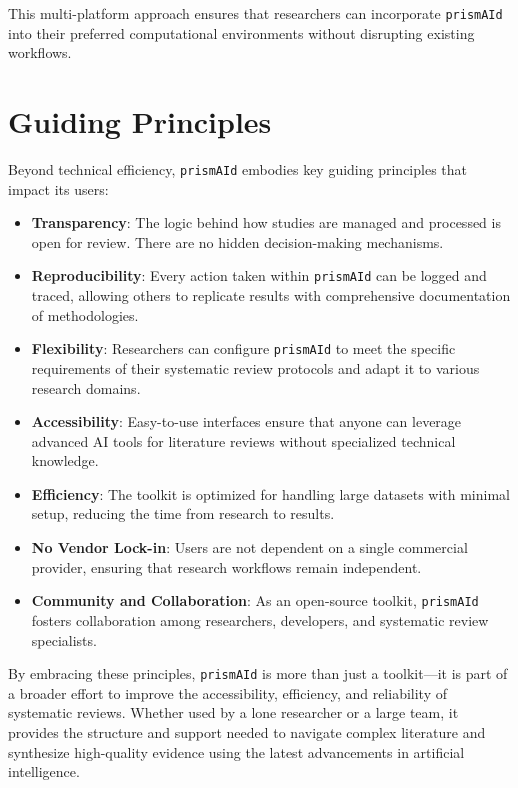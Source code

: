 This multi-platform approach ensures that researchers can incorporate \texttt{prismAId} into their preferred computational environments without disrupting existing workflows.

\section{Guiding Principles}

Beyond technical efficiency, \texttt{prismAId} embodies key guiding principles that impact its users:

\begin{itemize}
    \item \textbf{Transparency}: The logic behind how studies are managed and processed is open for review. There are no hidden decision-making mechanisms.

    \item \textbf{Reproducibility}: Every action taken within \texttt{prismAId} can be logged and traced, allowing others to replicate results with comprehensive documentation of methodologies.

    \item \textbf{Flexibility}: Researchers can configure \texttt{prismAId} to meet the specific requirements of their systematic review protocols and adapt it to various research domains.

    \item \textbf{Accessibility}: Easy-to-use interfaces ensure that anyone can leverage advanced AI tools for literature reviews without specialized technical knowledge.

    \item \textbf{Efficiency}: The toolkit is optimized for handling large datasets with minimal setup, reducing the time from research to results.

    \item \textbf{No Vendor Lock-in}: Users are not dependent on a single commercial provider, ensuring that research workflows remain independent.

    \item \textbf{Community and Collaboration}: As an open-source toolkit, \texttt{prismAId} fosters collaboration among researchers, developers, and systematic review specialists.
\end{itemize}

By embracing these principles, \texttt{prismAId} is more than just a toolkit—it is part of a broader effort to improve the accessibility, efficiency, and reliability of systematic reviews. Whether used by a lone researcher or a large team, it provides the structure and support needed to navigate complex literature and synthesize high-quality evidence using the latest advancements in artificial intelligence.

